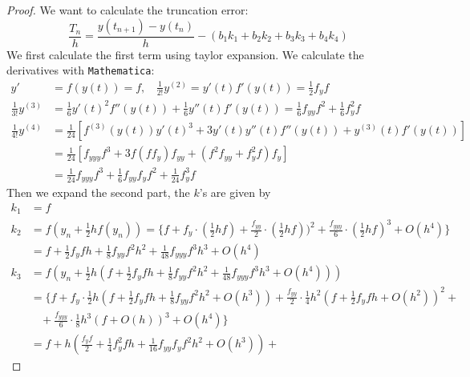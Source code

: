 \documentclass[a4paper, 10pt]{article}
\theoremstyle{definition}
\theoremstyle{hSol}
\begin{document}
\begin{proof} We want to calculate the truncation error:
$$
\frac{T_n}{h} = \frac{y(t_{n+1})-y(t_n)}{h} - (b_1k_1 + b_2 k_2 + b_3 k_3 + b_4k_4)
$$
We first calculate the first term using taylor expansion. We calculate the derivatives with \texttt{Mathematica}:
\begin{equation}
  \begin{split}
    y' &= f(y(t)) = f,~~~~\tfrac{1}{2!}y^{(2)} = y'(t) f'(y(t)) = \tfrac{1}{2}f_yf \\
    \tfrac{1}{3!}y^{(3)} &= \tfrac{1}{6}y'(t)^2 f''(y(t))+\tfrac{1}{6}y''(t) f'(y(t)) = \tfrac{1}{6}f_{yy}f^2 + \tfrac{1}{6}f_y^2 f\\
    \tfrac{1}{4!}y^{(4)} &=\tfrac{1}{24}[f^{(3)}(y(t)) y'(t)^3+3 y'(t) y''(t) f''(y(t))+y^{(3)}(t) f'(y(t))]\\
    &= \tfrac{1}{24}[f_{yyy}f^3 + 3f(ff_y)f_{yy} + (f^2f_{yy} + f_y^2 f)f_y] \\
    &= \tfrac{1}{24}f_{yyy}f^3 + \tfrac{1}{6}f_{yy}f_yf^2 + \tfrac{1}{24}f_y^3 f
  \end{split}
\end{equation}
Then we expand the second part, the $k$'s are given by
\begin{equation}
  \begin{split}
    k_1 &= f \\
    k_2 &= f(y_n + \tfrac{1}{2}hf(y_n)) = \{f+f_y\cdot(\tfrac{1}{2}hf) + \tfrac{f_{yy}}{2}\cdot(\tfrac{1}{2}hf))^2+\tfrac{f_{yyy}}{6}\cdot(\tfrac{1}{2}hf)^3+O(h^4)\}\\
    &= f + \tfrac{1}{2}f_yf h + \tfrac{1}{8}f_{yy}f^2 h^2 + \tfrac{1}{48}f_{yyy}f^3 h^3 + O(h^4)
    \end{split}
\end{equation}
\begin{equation}
  \begin{split}
    k_3 &= f\left(y_n + \tfrac{1}{2}h\left(f + \tfrac{1}{2}f_yf h + \tfrac{1}{8}f_{yy}f^2 h^2 + \tfrac{1}{48}f_{yyy}f^3 h^3 + O(h^4)\right)\right)\\
    &= \Big\{
    f + 
    f_y\cdot \tfrac{1}{2}h \left(f + \tfrac{1}{2}f_yf h + \tfrac{1}{8}f_{yy}f^2 h^2 + O(h^3)\right) + 
    \tfrac{f_{yy}}{2}\cdot \tfrac{1}{4}h^2 \left(f + \tfrac{1}{2}f_yf h + O(h^2)\right)^2 + 
    \\
    &~~~~+\tfrac{f_{yyy}}{6}\cdot \tfrac{1}{8}h^3 \left(f + O(h)\right)^3 + O(h^4) \Big\}\\
    &= f + 
    h \left(\tfrac{f_yf}{2} + \tfrac{1}{4}f_y^2f h + \tfrac{1}{16}f_{yy}f_yf^2 h^2 + O(h^3)\right)+

\end{split}
\end{equation}
\end{proof}
\end{document}
